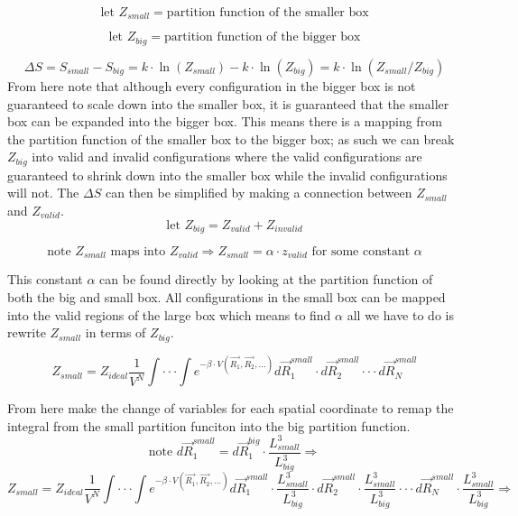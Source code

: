 \begin{equation}\label{eq:MCHS9}
\text{let }Z_{small}=\text{partition function of the smaller box}
\end{equation}

\begin{equation}\label{eq:MCHS10}
\text{let }Z_{big}=\text{partition function of the bigger box}
\end{equation}

\begin{equation}\label{eq:MCHS11}
\Delta S=S_{small}-S_{big}=k\cdot \ln(Z_{small})-k\cdot \ln(Z_{big})=k\cdot \ln(Z_{small}/Z_{big})
\end{equation}
From here note that although every configuration in the bigger box is not guaranteed to scale down into the smaller box, it is guaranteed that the smaller box can be expanded into the bigger box. This means there is a mapping from the partition function of the smaller box to the bigger box; as such we can break $Z_{big}$ into valid and invalid configurations where the valid configurations are guaranteed to shrink down into the smaller box while the invalid configurations will not. The $\Delta S$ can then be simplified by making a connection between $Z_{small}$ and $Z_{valid}$.
\begin{equation}\label{eq:MCHS12}
\text{let }Z_{big}=Z_{valid}+Z_{invalid}
\end{equation}

\begin{equation}\label{eq:MCHS13}
\text{note }Z_{small}\text{ maps into }Z_{valid} \Rightarrow Z_{small}=\alpha\cdot z_{valid}\text{ for some constant } \alpha
\end{equation}

This constant $\alpha$ can be found directly by looking at the partition function of both the big and small box. All configurations in the small box can be mapped into the valid regions of the large box which means to find $\alpha$ all we have to do is rewrite $Z_{small}$ in terms of $Z_{big}$.

\begin{equation}\label{eq:MCHS14}
Z_{small}=Z_{ideal}\frac{1}{V^N}\int\cdot\cdot\cdot\int e^{-\beta\cdot V(\vec{R_1},\vec{R_2},...)}d\vec{R}_1^{small}\cdot d\vec{R}_2^{small}\cdot\cdot\cdot d\vec{R}_N^{small}
\end{equation}

From here make the change of variables for each spatial coordinate to remap the integral from the small partition funciton into the big partition function.
\begin{equation}\label{eq:MCHS15}
\text{note }d\vec{R}_1^{small}=d\vec{R}_1^{big}\cdot \frac{L_{small}^3}{L_{big}^3}\Rightarrow
\end{equation}
\begin{equation}\label{eq:MCHS16}
Z_{small}=Z_{ideal}\frac{1}{V^N}\int\cdot\cdot\cdot\int e^{-\beta\cdot V(\vec{R_1},\vec{R_2},...)}d\vec{R}_1^{small}\cdot \frac{L_{small}^3}{L_{big}^3}\cdot d\vec{R}_2^{small}\cdot \frac{L_{small}^3}{L_{big}^3}\cdot\cdot\cdot d\vec{R}_N^{small}\cdot \frac{L_{small}^3}{L_{big}^3}\Rightarrow
\end{equation}

